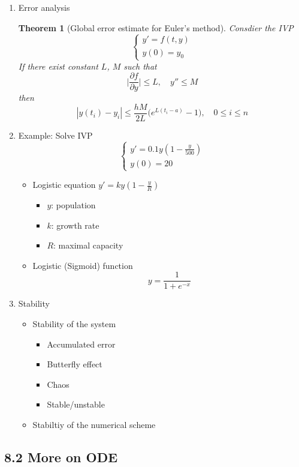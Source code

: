 \documentclass{article}
\newtheorem{thm}{Theorem}[section]
\theoremstyle{remark}
\begin{document}
\begin{enumerate}
\item Error analysis
\begin{thm}[Global error estimate for Euler's method]
Consdier the IVP
$$
\left\{\begin{array}{l}
y' = f(t,y)\\
y(0) = y_0
\end{array}\right.
$$
If there exist constant $L$, $M$ such that
$$
\Big|\frac{\partial f}{\partial y}\Big| \leq L,\quad y''\leq M
$$
then
$$
|y(t_i) -y_i|\leq \frac{hM}{2L}\Big(e^{L(t_i-a)}-1\Big),\quad 0\leq i \leq n
$$
\end{thm}

\item Example: 
Solve IVP
$$
\left\{\begin{array}{l}
y' = 0.1y(1-\frac{y}{500})\\
y(0) = 20
\end{array}\right.
$$
\begin{itemize}
\item Logistic equation
$
\displaystyle y' = ky(1-\frac{y}{R})
$
\begin{itemize}
\item $y$: population
\item $k$: growth rate
\item $R$: maximal capacity
\end{itemize}
\item Logistic (Sigmoid) function
$$
y = \frac{1}{1+e^{-x}}
$$
\end{itemize}

\item Stability
\begin{itemize}
\item Stability of the system
\begin{itemize}
\item Accumulated error
\item Butterfly effect
\item Chaos
\item Stable/unstable
\end{itemize}
\item Stabiltiy of the numerical scheme
\end{itemize}

\end{enumerate}


\subsection{8.2 More on ODE}
\end{document}

